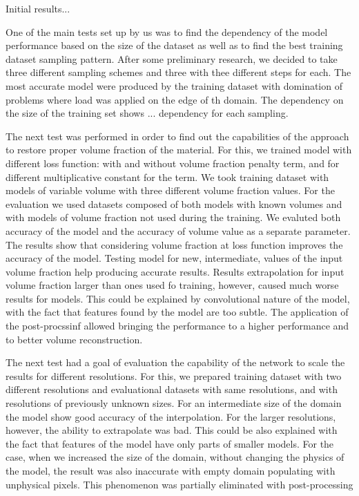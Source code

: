
Initial results...
\medskip

One of the main tests set up by us was to find the dependency of the model performance based on the size of the dataset as well as to find the best training dataset sampling pattern.
After some preliminary research, we decided to take three different sampling schemes and three with thee different steps for each. 
The most accurate model were produced by the training dataset with domination of problems where load was applied on the edge of th domain.
The dependency on the size of the training set shows ...  dependency for each sampling.
\medskip

The next test was performed in order to find out the capabilities of the approach to restore proper volume fraction of the material. 
For this, we trained model with different loss function: with and without volume fraction penalty term, and for different multiplicative constant for the term.
We took training dataset with models of variable volume with three different volume fraction values.
For the evaluation we used datasets composed of both models with known volumes and with models of volume fraction not used during the training.
We evaluted both accuracy of the model and the accuracy of volume value as a separate parameter.
The results show that considering volume fraction at loss function improves the accuracy of the model. 
Testing model for new, intermediate, values of the input volume fraction help producing accurate results.
Results extrapolation for input volume fraction larger than ones used fo training, however, caused much worse results for models. 
This could be explained by convolutional nature of the model, with the fact that features found by the model are too subtle.  
The application of the post-procssinf allowed bringing the performance to a higher performance and to better volume reconstruction. 
\medskip 

The next test had a goal of evaluation the capability of the network to scale the results for different resolutions.
For this, we prepared training dataset with two different resolutions and evaluational datasets with same resolutions, and with resolutions of previously unknown sizes.
For an intermediate size of the domain the model show good accuracy of the interpolation.
For the larger resolutions, however, the ability to extrapolate was bad.
This could be also explained with the fact that features of the model have only  parts of smaller models.
For the case, when we increased the size of the domain, without changing the physics of the model, the result was also inaccurate with empty domain populating with unphysical pixels.
This phenomenon was partially eliminated with post-processing
\medskip

